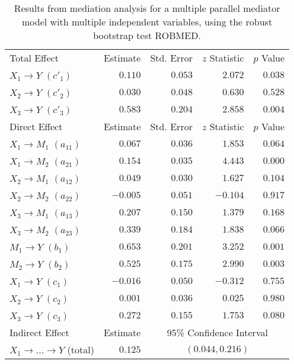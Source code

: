 \documentclass{article}\usepackage[]{graphicx}\usepackage[]{xcolor}
\begin{document}
\begin{table}[h!]
\caption{Results from mediation analysis for a multiple parallel mediator model with multiple independent variables, using the robust bootstrap test ROBMED.}
\begin{center}
\begin{tabular}{lrrrr}
\hline\noalign{\smallskip}
Total Effect & Estimate & Std. Error & $z$ Statistic & $p$ Value \\ 
\noalign{\smallskip}\hline\noalign{\smallskip}
$X_{1} \rightarrow Y$ $(c'_{1})$ & $0.110$ & $0.053$ & $2.072$ & $0.038$ \\ 
$X_{2} \rightarrow Y$ $(c'_{2})$ & $0.030$ & $0.048$ & $0.630$ & $0.528$ \\ 
$X_{3} \rightarrow Y$ $(c'_{3})$ & $0.583$ & $0.204$ & $2.858$ & $0.004$ \\ 
\noalign{\smallskip}\hline\noalign{\smallskip}
Direct Effect & Estimate & Std. Error & $z$ Statistic & $p$ Value \\ 
\noalign{\smallskip}\hline\noalign{\smallskip}
$X_{1} \rightarrow M_{1}$ $(a_{11})$ & $0.067$ & $0.036$ & $1.853$ & $0.064$ \\ 
$X_{1} \rightarrow M_{2}$ $(a_{21})$ & $0.154$ & $0.035$ & $4.443$ & $0.000$ \\ 
$X_{2} \rightarrow M_{1}$ $(a_{12})$ & $0.049$ & $0.030$ & $1.627$ & $0.104$ \\ 
$X_{2} \rightarrow M_{2}$ $(a_{22})$ & $-0.005$ & $0.051$ & $-0.104$ & $0.917$ \\ 
$X_{3} \rightarrow M_{1}$ $(a_{13})$ & $0.207$ & $0.150$ & $1.379$ & $0.168$ \\ 
$X_{3} \rightarrow M_{2}$ $(a_{23})$ & $0.339$ & $0.184$ & $1.838$ & $0.066$ \\ 
$M_{1} \rightarrow Y$ $(b_{1})$ & $0.653$ & $0.201$ & $3.252$ & $0.001$ \\ 
$M_{2} \rightarrow Y$ $(b_{2})$ & $0.525$ & $0.175$ & $2.990$ & $0.003$ \\ 
$X_{1} \rightarrow Y$ $(c_{1})$ & $-0.016$ & $0.050$ & $-0.312$ & $0.755$ \\ 
$X_{2} \rightarrow Y$ $(c_{2})$ & $0.001$ & $0.036$ & $0.025$ & $0.980$ \\ 
$X_{3} \rightarrow Y$ $(c_{3})$ & $0.272$ & $0.155$ & $1.753$ & $0.080$ \\ 
\noalign{\smallskip}\hline\noalign{\smallskip}
Indirect Effect & Estimate & \multicolumn{3}{c}{95\% Confidence Interval} \\ 
\noalign{\smallskip}\hline\noalign{\smallskip}
$X_{1} \rightarrow  \ldots  \rightarrow Y$ (total) & $0.125$ & \multicolumn{3}{c}{$(0.044, 0.216)$} \\ 

\end{tabular}
\end{center}
\end{table}
\end{document}
